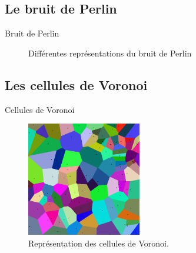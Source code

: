 \documentclass{beamer}
\begin{document}
\subsection{Le bruit de Perlin}
\begin{frame}{Bruit de Perlin}
  \begin{center}
    \begin{figure}
      \caption{Différentes représentations du bruit de Perlin}
    \end{figure}
  \end{center}
\end{frame}

\subsection{Les cellules de Voronoi}
\begin{frame}{Cellules de Voronoi}
  \begin{center}
    \begin{figure}
      \includegraphics[width=5cm]{Images/Images_Alexis/voronoi.png}
      \caption{Représentation des cellules de Voronoi.}
    \end{figure}
  \end{center}
\end{frame}
\end{document}
